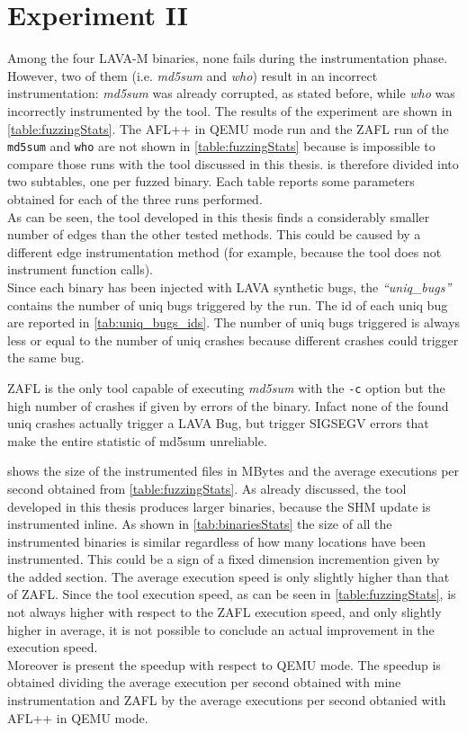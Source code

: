 \section{Experiment II}\label{sec:experiment2}
    Among the four LAVA-M binaries, none fails during the instrumentation phase.
    However, two of them (i.e. \textit{md5sum} and \textit{who}) result in an incorrect instrumentation:
    \textit{md5sum} was already corrupted, as stated before, while \textit{who} was incorrectly instrumented by the tool.
    The results of the experiment are shown in \cref{table:fuzzingStats}.
    The AFL++ in QEMU mode run and the ZAFL run of the \texttt{md5sum} and \texttt{who} are not shown in \cref{table:fuzzingStats} 
    because is impossible to compare those runs with the tool discussed in this thesis.
     is therefore divided into two subtables, one per fuzzed binary.
    Each table reports some parameters obtained for each of the three runs performed.\\
    As can be seen, the tool developed in this thesis finds a considerably smaller number of edges than the other tested methods.
    This could be caused by a different edge instrumentation method (for example, because the tool does not instrument 
    function calls).\\
    Since each binary has been injected with LAVA synthetic bugs, the \textit{``uniq\_bugs''} contains the number of uniq bugs 
    triggered by the run.
    The id of each uniq bug are reported in \cref{tab:uniq_bugs_ids}.
    The number of uniq bugs triggered is always less or equal to the number of uniq crashes because different 
    crashes could trigger the same bug.
        
    ZAFL is the only tool capable of executing \textit{md5sum} with the \texttt{-c} option but the high number 
    of crashes if given by errors of the binary.
    Infact none of the found uniq crashes actually trigger a LAVA Bug, but trigger SIGSEGV errors that make the entire statistic 
    of md5sum unreliable.

     shows the size of the instrumented files in MBytes and the average executions per 
    second obtained from \cref{table:fuzzingStats}.
    As already discussed, the tool developed in this thesis produces larger binaries, because the \gls{SHM} update 
    is instrumented inline. As shown in \cref{tab:binariesStats} the size of all the instrumented binaries is similar 
    regardless of how many locations have been instrumented.
    This could be a sign of a fixed dimension incremention given by the added section.
    The average execution speed is only slightly higher than that of ZAFL.
    Since the tool execution speed, as can be seen in \cref{table:fuzzingStats}, is not always higher with respect to 
    the ZAFL execution speed, and only slightly higher in average, it is not possible to conclude an actual improvement in the execution speed.\\
    Moreover is present the speedup with respect to QEMU mode.
    The speedup is obtained dividing the average execution per second obtained with mine instrumentation and ZAFL by the 
    average executions per second obtanied with AFL++ in QEMU mode.

